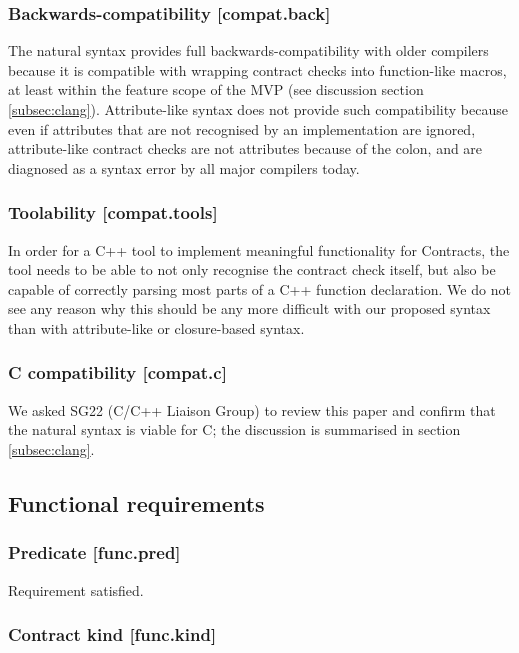 \subsubsection{Backwards-compatibility  [compat.back]}

The natural syntax provides full backwards-compatibility with older compilers because it is compatible with wrapping contract checks into function-like macros, at least within the feature scope of the MVP (see discussion section \ref{subsec:clang}). Attribute-like syntax does not provide such compatibility because even if attributes that are not recognised by an implementation are ignored, attribute-like contract checks are not attributes because of the colon, and are diagnosed as a syntax error by all major compilers today.

\subsubsection{Toolability [compat.tools]}

In order for a C++ tool to implement meaningful functionality for Contracts, the tool needs to be able to not only recognise the contract check itself, but also be capable of correctly parsing most parts of a C++ function declaration. We do not see any reason why this should be any more difficult with our proposed syntax than with attribute-like or closure-based syntax.

\subsubsection{C compatibility  [compat.c]}

We asked SG22 (C/C++ Liaison Group) to review this paper and confirm that the natural syntax is viable for C; the discussion is summarised in section \ref{subsec:clang}.

\subsection{Functional requirements}

\subsubsection{Predicate  [func.pred]}

Requirement satisfied.

\subsubsection{Contract kind  [func.kind]}


